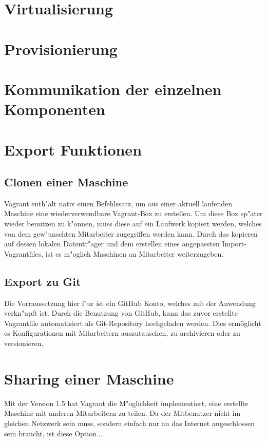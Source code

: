 \section{Virtualisierung}
\section{Provisionierung}
\section{Kommunikation der einzelnen Komponenten}
\section{Export Funktionen}

\subsection{Clonen einer Maschine}
Vagrant enth"alt nativ einen Befehlssatz, um aus einer aktuell laufenden Maschine eine wiederverwendbare Vagrant-Box zu erstellen.\newline
Um diese Box sp"ater wieder benutzen zu k"onnen, muss diese auf ein Laufwerk kopiert werden, welches von dem gew"unschten Mitarbeiter zugegriffen werden kann. Durch das kopieren auf dessen lokalen Datentr"ager und dem erstellen eines angepassten Import-Vagrantfiles, ist es m"oglich Maschinen an Mitarbeiter weiterzugeben.

\subsection{Export zu Git}
Die Vorraussetzung hier f"ur ist ein GitHub Konto, welches mit der Anwendung verkn"upft ist. \newline
Durch die Benutzung von GitHub, kann das zuvor erstellte Vagrantfile automatisiert als Git-Repository hochgeladen werden.\newline
Dies ermöglicht es Konfigurationen mit Mitarbeitern auszutauschen, zu archivieren oder zu versionieren.


\section{Sharing einer Maschine}
Mit der Version 1.5 hat Vagrant die M"oglichkeit implementiert, eine erstellte Maschine mit anderen Mitarbeitern zu teilen.\newline
Da der Mitbenutzer nicht im gleichen Netzwerk sein muss, sondern einfach nur an das Internet angeschlossen sein braucht, ist diese Option...


